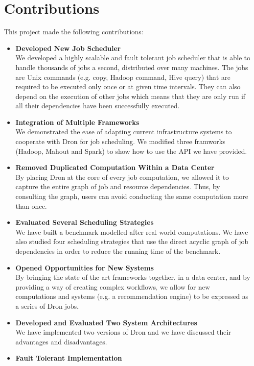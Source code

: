 \documentclass[11pt,a4paper,twoside]{report}
\begin{document}
\section{Contributions}
This project made the following contributions:
\begin{itemize}
\item{}
\textbf{Developed New Job Scheduler}\\
We developed a highly scalable and fault tolerant job scheduler that is able to handle thousands of jobs a second, distributed over many machines. The jobs are Unix commands (e.g. copy, Hadoop command, Hive query) that are required to be executed only once or at given time intervals. They can also depend on the execution of other jobs which means that they are only run if all their dependencies have been successfully executed.
\item{}
\textbf{Integration of Multiple Frameworks}\\
We demonstrated the ease of adapting current infrastructure systems to cooperate with Dron for job scheduling. We modified three framworks (Hadoop, Mahout and Spark) to show how to use the API we have provided.
\item{}
\textbf{Removed Duplicated Computation Within a Data Center}\\
By placing Dron at the core of every job computation, we allowed it to capture the entire graph of job and resource dependencies. Thus, by consulting the graph, users can avoid conducting the same computation more than once.
\item{}
\textbf{Evaluated Several Scheduling Strategies}\\
We have built a benchmark modelled after real world computations. We have also studied four scheduling strategies that use the direct acyclic graph of job dependencies in order to reduce the running time of the benchmark.
\item{}
\textbf{Opened Opportunities for New Systems}\\
By bringing the state of the art frameworks together, in a data center, and by providing a way of creating complex workflows, we allow for new computations and systems (e.g. a recommendation engine) to be expressed as a series of Dron jobs.
\item{}
\textbf{Developed and Evaluated Two System Architectures}\\
We have implemented two versions of Dron and we have discussed their advantages and disadvantages.
\item{}
\textbf{Fault Tolerant Implementation}\\

\end{itemize}
\end{document}
